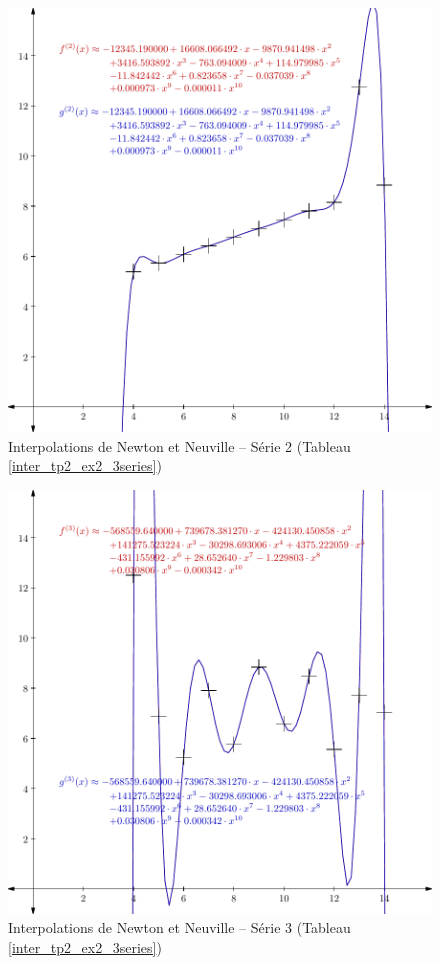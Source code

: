 \documentclass{report}
\begin{document}
	\begin{figure}[h]
	  \centering
	  \includegraphics[scale=0.5]{graphiques/pdf_output/inter_tp2_ex2_2.pdf}
	  \caption{Interpolations de Newton et Neuville -- Série 2 (Tableau \ref{inter_tp2_ex2_3series})}
	\end{figure}
	\newpage
	\begin{figure}[h]
	  \centering
 	  \includegraphics[scale=0.5]{graphiques/pdf_output/inter_tp2_ex2_3.pdf}
	  \caption{Interpolations de Newton et Neuville -- Série 3 (Tableau \ref{inter_tp2_ex2_3series})}
	\end{figure}
      \newpage
\end{document}
